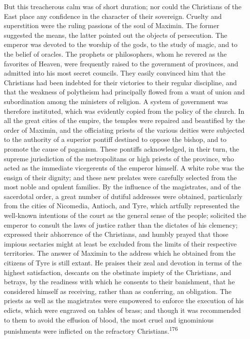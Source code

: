 But this treacherous calm was of short duration; nor could the
Christians of the East place any confidence in the character of
their sovereign. Cruelty and superstition were the ruling
passions of the soul of Maximin. The former suggested the means,
the latter pointed out the objects of persecution. The emperor
was devoted to the worship of the gods, to the study of magic,
and to the belief of oracles. The prophets or philosophers, whom
he revered as the favorites of Heaven, were frequently raised to
the government of provinces, and admitted into his most secret
councils. They easily convinced him that the Christians had been
indebted for their victories to their regular discipline, and
that the weakness of polytheism had principally flowed from a
want of union and subordination among the ministers of religion.
A system of government was therefore instituted, which was
evidently copied from the policy of the church. In all the great
cities of the empire, the temples were repaired and beautified by
the order of Maximin, and the officiating priests of the various
deities were subjected to the authority of a superior pontiff
destined to oppose the bishop, and to promote the cause of
paganism. These pontiffs acknowledged, in their turn, the supreme
jurisdiction of the metropolitans or high priests of the
province, who acted as the immediate vicegerents of the emperor
himself. A white robe was the ensign of their dignity; and these
new prelates were carefully selected from the most noble and
opulent families. By the influence of the magistrates, and of the
sacerdotal order, a great number of dutiful addresses were
obtained, particularly from the cities of Nicomedia, Antioch, and
Tyre, which artfully represented the well-known intentions of the
court as the general sense of the people; solicited the emperor
to consult the laws of justice rather than the dictates of his
clemency; expressed their abhorrence of the Christians, and
humbly prayed that those impious sectaries might at least be
excluded from the limits of their respective territories. The
answer of Maximin to the address which he obtained from the
citizens of Tyre is still extant. He praises their zeal and
devotion in terms of the highest satisfaction, descants on the
obstinate impiety of the Christians, and betrays, by the
readiness with which he consents to their banishment, that he
considered himself as receiving, rather than as conferring, an
obligation. The priests as well as the magistrates were empowered
to enforce the execution of his edicts, which were engraved on
tables of brass; and though it was recommended to them to avoid
the effusion of blood, the most cruel and ignominious punishments
were inflicted on the refractory Christians.\textsuperscript{176}

